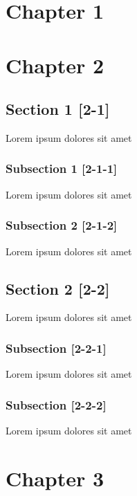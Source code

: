\chapter{Chapter 1}
\label{chap:included}

\chapter{Chapter 2}
\label{chap:sibling}

\section{Section 1 [2-1]}
\label{sec:section}

Lorem ipsum dolores sit amet

\subsection{Subsection 1 [2-1-1]}
\label{subsec:subsection}

Lorem ipsum dolores sit amet

\subsection{Subsection 2 [2-1-2]}
\label{subsec:sibling-subsection}

Lorem ipsum dolores sit amet

\section{Section 2 [2-2]}
\label{sec:another}

Lorem ipsum dolores sit amet

\subsection{Subsection [2-2-1]}
\label{subsec:another-2}

Lorem ipsum dolores sit amet

\subsection{Subsection [2-2-2]}
\label{subsec:another-3}

Lorem ipsum dolores sit amet

\chapter{Chapter 3}
\label{chap:othersibling}